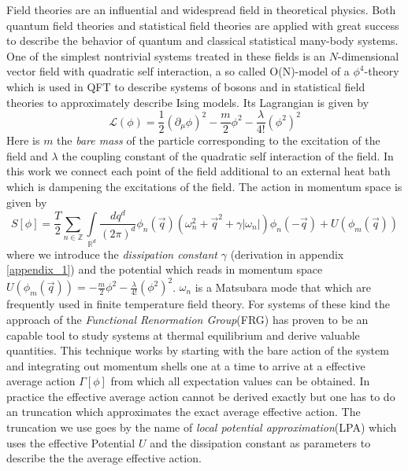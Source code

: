 Field theories are an influential and widespread field in theoretical physics. Both quantum field theories and statistical field theories are applied with great success to describe the behavior of quantum and classical statistical many-body systems.  One of the simplest nontrivial systems treated in these fields is an $N$-dimensional vector field with quadratic self interaction, a so called O(N)-model of a $\phi^4$-theory which is used in QFT to describe systems of bosons and in statistical field theories to approximately describe Ising models. Its Lagrangian is given by
\begin{equation}\label{phi4model}
\mathcal{L}(\phi) = \frac{1}{2}\left(\partial_\mu\phi\right)^2-\frac{m}{2}\phi^2-\frac{\lambda}{4!}\left(\phi^2\right)^2
\end{equation}
Here is $m$ the \textit{bare mass} of the particle corresponding to the excitation of the field and $\lambda$ the coupling constant of the quadratic self interaction of the field.  
In this work we connect each point of the field additional to an external heat bath which is dampening the excitations of the field. The action in momentum space is given by
\begin{equation}
S[\phi] =   \frac{T}{2}\sum\limits_{n \in \mathbb{Z}}\int\limits_{\mathbb{R}^d}\frac{dq^d}{(2\pi)^d}\phi_n(\vec q)\left(\omega_n^2+\vec q^2+\gamma |\omega_n|\right)\phi_n(-\vec q)+U(\phi_m(\vec q))
\end{equation}
where we introduce the \textit{dissipation constant} $\gamma$ (derivation in appendix \ref{appendix_1}) and the potential which reads in momentum space $U(\phi_m(\vec q)) = -\frac{m}{2}\phi^2-\frac{\lambda}{4!}\left(\phi^2\right)^2$. $\omega_n$ is a Matsubara mode that which are frequently used in finite temperature field theory\cite{matsubara}. For systems of these kind the approach of the \textit{Functional Renormation Group}(FRG)\cite{Gies_2012}\cite{BOHR_2001}\cite{WETTERICH199390} has proven to be an capable tool to study  systems at thermal equilibrium and derive valuable quantities. This technique works by starting with the bare action of the system and integrating out momentum shells one at a time to arrive at a effective average action $\Gamma[\phi]$ from which all expectation values can be obtained. In practice the effective average action cannot be derived exactly but one has to do an truncation which approximates the exact average effective action. The truncation we use goes by the name of \textit{local potential approximation}(LPA)\cite{ZUMBACH1994225} which uses the effective Potential $U$ and the dissipation constant as parameters to describe the the average effective action.
